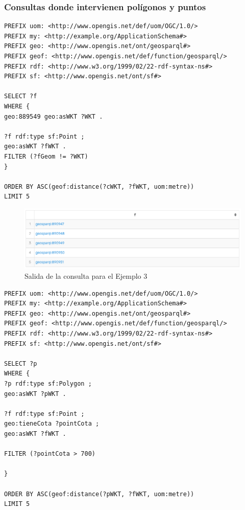 

\subsubsection{Consultas donde intervienen polígonos y puntos}

\begin{lstlisting}
PREFIX uom: <http://www.opengis.net/def/uom/OGC/1.0/>
PREFIX my: <http://example.org/ApplicationSchema#>
PREFIX geo: <http://www.opengis.net/ont/geosparql#>
PREFIX geof: <http://www.opengis.net/def/function/geosparql/>
PREFIX rdf: <http://www.w3.org/1999/02/22-rdf-syntax-ns#>
PREFIX sf: <http://www.opengis.net/ont/sf#>

SELECT ?f
WHERE {
geo:889549 geo:asWKT ?WKT .

?f rdf:type sf:Point ;
geo:asWKT ?fWKT .
FILTER (?fGeom != ?WKT)
}

ORDER BY ASC(geof:distance(?cWKT, ?fWKT, uom:metre))
LIMIT 5
\end{lstlisting}

\begin{figure}[H]
	\centering
	\includegraphics[width=0.9\linewidth]{imagenes/capitulo5/salida9}
	\caption{Salida de la consulta para el Ejemplo 3}
	\label{fig:salida9}
\end{figure}


\begin{lstlisting}
PREFIX uom: <http://www.opengis.net/def/uom/OGC/1.0/>
PREFIX my: <http://example.org/ApplicationSchema#>
PREFIX geo: <http://www.opengis.net/ont/geosparql#>
PREFIX geof: <http://www.opengis.net/def/function/geosparql/>
PREFIX rdf: <http://www.w3.org/1999/02/22-rdf-syntax-ns#>
PREFIX sf: <http://www.opengis.net/ont/sf#>

SELECT ?p
WHERE {
?p rdf:type sf:Polygon ;
geo:asWKT ?pWKT .

?f rdf:type sf:Point ;
geo:tieneCota ?pointCota ;
geo:asWKT ?fWKT .

FILTER (?pointCota > 700)

}

ORDER BY ASC(geof:distance(?pWKT, ?fWKT, uom:metre))
LIMIT 5
\end{lstlisting}

